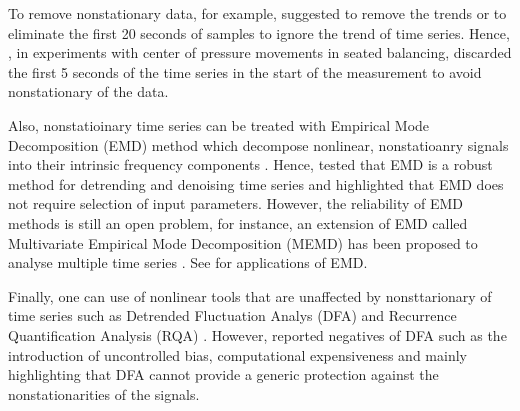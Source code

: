 To remove nonstationary data, for example, \cite{carroll1993} suggested 
to remove the trends or to eliminate the first 20 seconds of samples to 
ignore the trend of time series. %
Hence, \cite{vandieen2010}, in experiments with center of pressure movements 
in seated balancing, discarded the first 5 seconds of the time series 
in the start of the measurement to avoid nonstationary of the data.

Also, nonstatioinary time series can be treated with Empirical Mode 
Decomposition (EMD) method which decompose nonlinear, nonstatioanry signals 
into their intrinsic frequency components \citep{huang1998, wu-huang2004, 
wu-huang2009}. Hence, \cite{flandrin2004, costa2007} tested that EMD is a 
robust method for detrending and denoising time series and highlighted that 
 EMD does not require selection of input parameters. However, the reliability 
of EMD methods is still an open problem, for instance, an extension of EMD 
called Multivariate Empirical Mode Decomposition (MEMD) has been proposed 
to analyse multiple time series \citep{rehman2010, mandic2013}.
See \citep{wu-hu2006, costa2007, daubechies2011, bonnet2014, mert2018}
for applications of EMD.


Finally, one can use of nonlinear tools that are unaffected by nonsttarionary 
of time series such as Detrended Fluctuation Analys (DFA) \citep{hausdorff1995}
and Recurrence Quantification Analysis (RQA) \citep{zbilut1992, trulla1996, 
marwan2008}. 
However, \cite{bryce2012} reported negatives of DFA such as the introduction
of uncontrolled bias, computational expensiveness and mainly highlighting 
that DFA cannot provide a generic protection against the nonstationarities 
of the signals.








